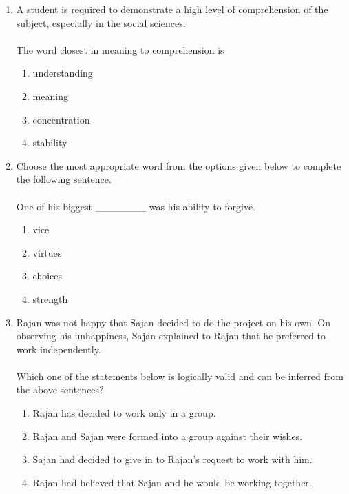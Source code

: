 \documentclass[journal]{IEEEtran}
\begin{document}
\begin{enumerate}
    \item A student is required to demonstrate a high level of \underline{comprehension} of the subject, especially in the
    social sciences. \\ \\ The word closest in meaning to \underline{comprehension} is
        \begin{enumerate}
            \item understanding
            \item meaning
            \item concentration
            \item stability
        \end{enumerate}

    \item Choose the most appropriate word from the options given below to complete the following
    sentence. \\ \\ One of his biggest \_\_\_\_\_\_\_ was his ability to forgive.
        \begin{enumerate}
            \item vice
            \item virtues
            \item choices
            \item strength
        \end{enumerate}

    \item Rajan was not happy that Sajan decided to do the project on his own. On observing his unhappiness, Sajan explained to Rajan that he preferred to work independently. \\ \\ Which one of the statements below is logically valid and can be inferred from the above sentences?
        \begin{enumerate}
            \item Rajan has decided to work only in a group.
            \item Rajan and Sajan were formed into a group against their wishes.
            \item Sajan had decided to give in to Rajan's request to work with him.
            \item Rajan had believed that Sajan and he would be working together.
        \end{enumerate}
        

\end{enumerate}
\end{document}
